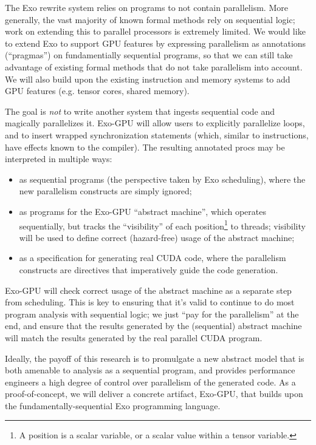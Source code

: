 The Exo rewrite system relies on programs to not contain parallelism.
More generally, the vast majority of known formal methods rely on sequential logic; work on extending this to parallel processors is extremely limited.
We would like to extend Exo to support GPU features by expressing parallelism as annotations (``pragmas'') on fundamentially sequential programs, so that we can still take advantage of existing formal methods that do not take parallelism into account.
We will also build upon the existing instruction and memory systems to add GPU features (e.g. tensor cores, shared memory).

\filbreak
The goal is \textit{not} to write another system that ingests sequential code and magically parallelizes it.
Exo-GPU will allow users to explicitly parallelize loops, and to insert wrapped synchronization statements (which, similar to instructions, have effects known to the compiler).
The resulting annotated procs may be interpreted in multiple ways:

\begin{itemize}
  \item as sequential programs (the perspective taken by Exo scheduling), where the new parallelism constructs are simply ignored;
  \item as programs for the Exo-GPU ``abstract machine'', which operates sequentially, but tracks the ``visibility'' of each position\footnote{A position is a scalar variable, or a scalar value within a tensor variable.} to threads;
  visibility will be used to define correct (hazard-free) usage of the abstract machine;
  \item as a specification for generating real CUDA code, where the parallelism constructs are directives that imperatively guide the code generation.
\end{itemize}

\filbreak
Exo-GPU will check correct usage of the abstract machine as a separate step from scheduling.
This is key to ensuring that it's valid to continue to do most program analysis with sequential logic; we just ``pay for the parallelism'' at the end, and ensure that the results generated by the (sequential) abstract machine will match the results generated by the real parallel CUDA program.

\filbreak
Ideally, the payoff of this research is to promulgate a new abstract model that is both amenable to analysis as a sequential program, and provides performance engineers a high degree of control over parallelism of the generated code.
As a proof-of-concept, we will deliver a concrete artifact, Exo-GPU, that builds upon the fundamentally-sequential Exo programming language.


